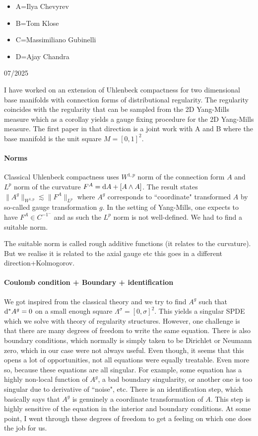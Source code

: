 \documentclass[./Research_statement.tex]{subfiles}
\begin{document}
\begin{itemize}
    \item A=Ilya Chevyrev
    \item B=Tom Klose
    \item C=Massimiliano Gubinelli
    \item D=Ajay Chandra
\end{itemize}

07/2025

\medskip 

I have worked on an extension of Uhlenbeck compactness  for two dimensional base manifolds with connection forms of distributional regularity. The regularity coincides with the regularity that can be sampled from the 2D Yang-Mills measure which as a corollay yields a gauge fixing procedure for the 2D Yang-Mills measure. The first paper in that direction is a joint work with A and B where the base manifold is the unit square $M=[0,1]^2$. 

\paragraph{Norms}
Classical Uhlenbeck compactness uses $W^{1,p}$ norm of the connection form $A$ and $L^p$ norm of the curvature $F^A=\mathrm{d} A+[A\wedge A]$. The result states $\|A^g\|_{W^{1,p}}\lesssim \|F^A\|_{L^p}$ where $A^g$ corresponds to ``coordinate" transformed $A$ by so-called gauge transformation $g$. In the setting of Yang-Mills, one expects to have $F^A\in C^{-1^-}$ and as such the $L^p$ norm is not well-defined. We had to find a suitable norm. 

The suitable norm is called rough additive functions (it relates to the curvature). But we realise it is related to the axial gauge etc this goes in a different direction+Kolmogorov. 

\paragraph{Coulomb condition + Boundary + identification}
We got inspired from the classical theory and we try to find $A^g$ such that $\mathrm{d}^*A^g=0$ on  a small enough square $\Lambda^\sigma=[0,\sigma]^2$. This yields a singular SPDE which we solve with theory of regularity structures. However, one challenge is that there are many degrees of freedom to write the same equation. There is also boundary conditions, which normally is simply taken to be Dirichlet or Neumann zero, which in our case were not always useful. Even though, it seems that this opens a lot of opportunities, not all equations were equally treatable. Even more so, because these equations are all singular.
For example, some equation has a highly non-local function of $A^g$, a bad boundary singularity, or another one is too singular due to derivative of ``noise", etc.  There is an identification step, which basically says that $A^g$ is genuinely a coordinate transformation of $A$. This step is highly sensitive of the equation in the interior and boundary conditions. At some point, I went through these degrees of freedom to get a feeling on which one does the job for us. 
\end{document}
